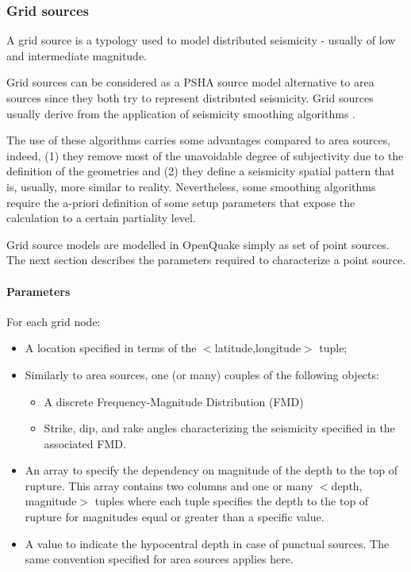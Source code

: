 \subsubsection{Grid sources}
A grid source  is a typology used to model distributed seismicity - usually of low and intermediate magnitude.

Grid sources can be considered as a PSHA source model alternative to area 
sources since they both try to represent distributed seismicity. Grid sources 
usually derive from the application of seismicity smoothing algorithms 
\citep{frankel1995,woo1996}. 

The use of these algorithms carries some advantages compared to area sources, 
indeed, (1) they remove most of the unavoidable degree of subjectivity due to 
the definition of the geometries and (2) they define a seismicity spatial 
pattern that is, usually, more similar to reality. Nevertheless, some smoothing 
algorithms require the a-priori definition of some setup parameters that expose 
the calculation to a certain partiality level.

Grid source models are modelled in OpenQuake simply as set of 
point sources. The next section describes the parameters required to 
characterize a point source.
%
\paragraph{Parameters}
%
For each grid node:
\begin{itemize}
\item A location specified in terms of the $<$latitude,longitude$>$ tuple;
\item Similarly to area sources, one (or many) couples of the following objects:
	\begin{itemize}
	\item A discrete Frequency-Magnitude Distribution (FMD)
	\item Strike, dip, and rake angles characterizing the seismicity specified 
	in the associated FMD. 
	\end{itemize}
\item An array to specify the dependency on magnitude of the depth to the top of 
	rupture. This array contains two columns and one or many 
	$<$depth, magnitude$>$ tuples where each tuple specifies the depth to the 
	top of rupture for magnitudes equal or greater than a specific value. 
\item A value to indicate the hypocentral depth in case of punctual sources. The 
	same convention specified for area sources applies here. 
\end{itemize}
%
